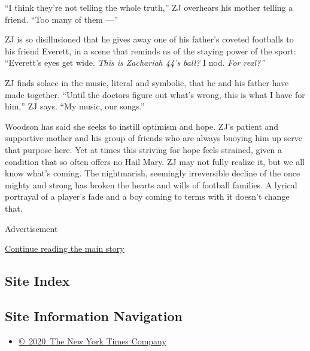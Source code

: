 ``I think they're not telling the whole truth,'' ZJ overhears his mother
telling a friend. ``Too many of them ---''

ZJ is so disillusioned that he gives away one of his father's coveted
footballs to his friend Everett, in a scene that reminds us of the
staying power of the sport: ``Everett's eyes get wide. \emph{This is
Zachariah 44's ball?} I nod. \emph{For real?''}

ZJ finds solace in the music, literal and symbolic, that he and his
father have made together. ``Until the doctors figure out what's wrong,
this is what I have for him,'' ZJ says. ``My music, our songs.''

Woodson has said she seeks to instill optimism and hope. ZJ's patient
and supportive mother and his group of friends who are always buoying
him up serve that purpose here. Yet at times this striving for hope
feels strained, given a condition that so often offers no Hail Mary. ZJ
may not fully realize it, but we all know what's coming. The
nightmarish, seemingly irreversible decline of the once mighty and
strong has broken the hearts and wills of football families. A lyrical
portrayal of a player's fade and a boy coming to terms with it doesn't
change that.

Advertisement

\protect\hyperlink{after-bottom}{Continue reading the main story}

\hypertarget{site-index}{%
\subsection{Site Index}\label{site-index}}

\hypertarget{site-information-navigation}{%
\subsection{Site Information
Navigation}\label{site-information-navigation}}

\begin{itemize}
\tightlist
\item
  \href{https://help.nytimes3xbfgragh.onion/hc/en-us/articles/115014792127-Copyright-notice}{©~2020~The
  New York Times Company}
\end{itemize}

